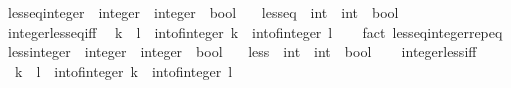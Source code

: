 \begin{isabellebody}
\isanewline
{}\isamarkupfalse%
\ less{\isacharunderscore}{\kern0pt}eq{\isacharunderscore}{\kern0pt}integer\ {\isacharcolon}{\kern0pt}{\isacharcolon}{\kern0pt}\ {\isachardoublequoteopen}integer\ {\isasymRightarrow}\ integer\ {\isasymRightarrow}\ bool{\isachardoublequoteclose}\isanewline
\ \ \ {\isachardoublequoteopen}less{\isacharunderscore}{\kern0pt}eq\ {\isacharcolon}{\kern0pt}{\isacharcolon}{\kern0pt}\ int\ {\isasymRightarrow}\ int\ {\isasymRightarrow}\ bool{\isachardoublequoteclose}\isanewline
%
\isadelimproof
\ \ %
\endisadelimproof
%
\isatagproof
\isacommand{{\isachardot}{\kern0pt}}\isamarkupfalse%
%
\endisatagproof
{\isafoldproof}%
%
\isadelimproof
\isanewline
%
\endisadelimproof
\isanewline
{}\isamarkupfalse%
\ integer{\isacharunderscore}{\kern0pt}less{\isacharunderscore}{\kern0pt}eq{\isacharunderscore}{\kern0pt}iff{\isacharcolon}{\kern0pt}\isanewline
\ \ {\isachardoublequoteopen}k\ {\isasymle}\ l\ {\isasymlongleftrightarrow}\ int{\isacharunderscore}{\kern0pt}of{\isacharunderscore}{\kern0pt}integer\ k\ {\isasymle}\ int{\isacharunderscore}{\kern0pt}of{\isacharunderscore}{\kern0pt}integer\ l{\isachardoublequoteclose}\isanewline
%
\isadelimproof
\ \ %
\endisadelimproof
%
\isatagproof
{}\isamarkupfalse%
\ {\isacharparenleft}{\kern0pt}fact\ less{\isacharunderscore}{\kern0pt}eq{\isacharunderscore}{\kern0pt}integer{\isachardot}{\kern0pt}rep{\isacharunderscore}{\kern0pt}eq{\isacharparenright}{\kern0pt}%
\endisatagproof
{\isafoldproof}%
%
\isadelimproof
\isanewline
%
\endisadelimproof
\isanewline
{}\isamarkupfalse%
\ less{\isacharunderscore}{\kern0pt}integer\ {\isacharcolon}{\kern0pt}{\isacharcolon}{\kern0pt}\ {\isachardoublequoteopen}integer\ {\isasymRightarrow}\ integer\ {\isasymRightarrow}\ bool{\isachardoublequoteclose}\isanewline
\ \ \ {\isachardoublequoteopen}less\ {\isacharcolon}{\kern0pt}{\isacharcolon}{\kern0pt}\ int\ {\isasymRightarrow}\ int\ {\isasymRightarrow}\ bool{\isachardoublequoteclose}\isanewline
%
\isadelimproof
\ \ %
\endisadelimproof
%
\isatagproof
\isacommand{{\isachardot}{\kern0pt}}\isamarkupfalse%
%
\endisatagproof
{\isafoldproof}%
%
\isadelimproof
\isanewline
%
\endisadelimproof
\isanewline
{}\isamarkupfalse%
\ integer{\isacharunderscore}{\kern0pt}less{\isacharunderscore}{\kern0pt}iff{\isacharcolon}{\kern0pt}\isanewline
\ \ {\isachardoublequoteopen}k\ {\isacharless}{\kern0pt}\ l\ {\isasymlongleftrightarrow}\ int{\isacharunderscore}{\kern0pt}of{\isacharunderscore}{\kern0pt}integer\ k\ {\isacharless}{\kern0pt}\ int{\isacharunderscore}{\kern0pt}of{\isacharunderscore}{\kern0pt}integer\ l{\isachardoublequoteclose}\isanewline

\end{isabellebody}
